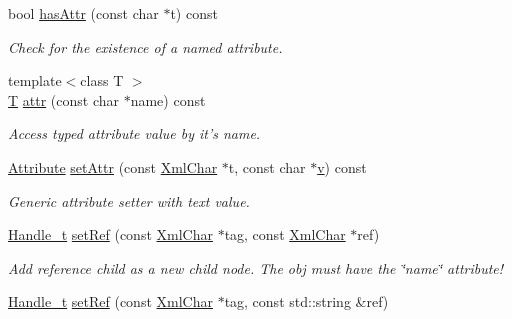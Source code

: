 \begin{DoxyCompactItemize}
bool \hyperlink{class_d_d4hep_1_1_x_m_l_1_1_handle__t_a3092f69a380f662117c5b71f873d3590}{hasAttr} (const char $\ast$t) const 
\begin{DoxyCompactList}\small\item\em Check for the existence of a named attribute. \item\end{DoxyCompactList}\item 
{\footnotesize template$<$class T $>$ }\\\hyperlink{class_t}{T} \hyperlink{class_d_d4hep_1_1_x_m_l_1_1_handle__t_aea59fed044f5d3cfbf0c27256e47375e}{attr} (const char $\ast$name) const 
\begin{DoxyCompactList}\small\item\em Access typed attribute value by it's name. \item\end{DoxyCompactList}\item 
\hyperlink{namespace_d_d4hep_1_1_x_m_l_a5c19b7116be99d69b4b22d911357baaf}{Attribute} \hyperlink{class_d_d4hep_1_1_x_m_l_1_1_handle__t_ac7cfe57bdf20974d10144c69a2a52447}{setAttr} (const \hyperlink{namespace_d_d4hep_1_1_x_m_l_a09e5d9cc86ed782f6826dfe0778c1815}{XmlChar} $\ast$t, const char $\ast$\hyperlink{_multi_view_8cpp_a8320ee13ac034dbf6d624fe8953dd337}{v}) const 
\begin{DoxyCompactList}\small\item\em Generic attribute setter with text value. \item\end{DoxyCompactList}\item 
\hyperlink{class_d_d4hep_1_1_x_m_l_1_1_handle__t}{Handle\_\-t} \hyperlink{class_d_d4hep_1_1_x_m_l_1_1_handle__t_a2906b635e870e0f88f60ca39c575bceb}{setRef} (const \hyperlink{namespace_d_d4hep_1_1_x_m_l_a09e5d9cc86ed782f6826dfe0778c1815}{XmlChar} $\ast$tag, const \hyperlink{namespace_d_d4hep_1_1_x_m_l_a09e5d9cc86ed782f6826dfe0778c1815}{XmlChar} $\ast$ref)
\begin{DoxyCompactList}\small\item\em Add reference child as a new child node. The obj must have the \char`\"{}name\char`\"{} attribute! \item\end{DoxyCompactList}\item 
\hyperlink{class_d_d4hep_1_1_x_m_l_1_1_handle__t}{Handle\_\-t} \hyperlink{class_d_d4hep_1_1_x_m_l_1_1_handle__t_aca8789134902fbaf62ce44fc5e51400d}{setRef} (const \hyperlink{namespace_d_d4hep_1_1_x_m_l_a09e5d9cc86ed782f6826dfe0778c1815}{XmlChar} $\ast$tag, const std::string \&ref)

\end{DoxyCompactItemize}
